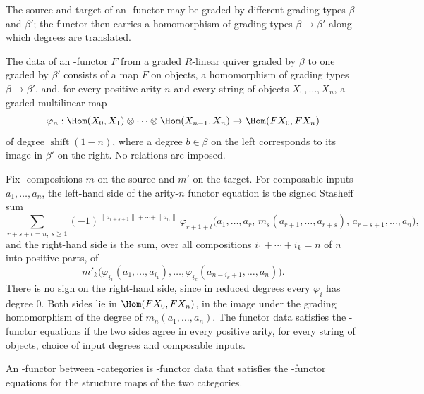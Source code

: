 The source and target of an \Ainf{}-functor may be graded by different grading
types $\beta$ and $\beta'$; the functor then carries a homomorphism of grading
types $\beta \to \beta'$ along which degrees are translated.

\begin{definition}
\label{AInfinityTheory.AInfinityFunctorData}
\leanok
{}
The data of an \Ainf{}-functor $F$ from a graded $R$-linear quiver graded by
$\beta$ to one graded by $\beta'$ consists of a map $F$ on objects, a homomorphism
of grading types $\beta \to \beta'$, and, for every positive arity $n$ and every
string of objects $X_0,\dots,X_n$, a graded multilinear map
\[
  \varphi_n : \Hom(X_0,X_1) \otimes \cdots \otimes \Hom(X_{n-1},X_n) \to \Hom(FX_0, FX_n)
\]
of degree $\operatorname{shift}(1-n)$, where a degree $b \in \beta$ on the left
corresponds to its image in $\beta'$ on the right. No relations are imposed.
\end{definition}

\begin{definition}
\label{AInfinityTheory.AInfinityFunctorData.SatisfiesFunctorEquations}
\leanok
{}
Fix \Ainf{}-compositions $m$ on the source and $m'$ on the target. For composable
inputs $a_1,\dots,a_n$, the left-hand side of the arity-$n$ functor equation is
the signed Stasheff sum
\[
  \sum_{r+s+t=n,\ s\geq 1} (-1)^{\|a_{r+s+1}\| + \cdots + \|a_n\|}\,
  \varphi_{r+1+t}\bigl(a_1,\dots,a_r,\, m_s(a_{r+1},\dots,a_{r+s}),\, a_{r+s+1},\dots,a_n\bigr),
\]
and the right-hand side is the sum, over all compositions $i_1 + \cdots + i_k = n$
of $n$ into positive parts, of
\[
  m'_k\bigl(\varphi_{i_1}(a_1,\dots,a_{i_1}),\dots,\varphi_{i_k}(a_{n-i_k+1},\dots,a_n)\bigr).
\]
There is no sign on the right-hand side, since in reduced degrees every
$\varphi_i$ has degree $0$. Both sides lie in $\Hom(FX_0,FX_n)$, in the image under
the grading homomorphism of the degree of $m_n(a_1,\dots,a_n)$. The functor data satisfies the
\Ainf{}-functor equations if the two sides agree in every positive arity, for
every string of objects, choice of input degrees and composable inputs.
\end{definition}

\begin{definition}
\label{AInfinityTheory.AInfinityFunctor}
\leanok
{}
An \Ainf{}-functor between \Ainf{}-categories is \Ainf{}-functor data that
satisfies the \Ainf{}-functor equations for the structure maps of the two
categories.
\end{definition}
